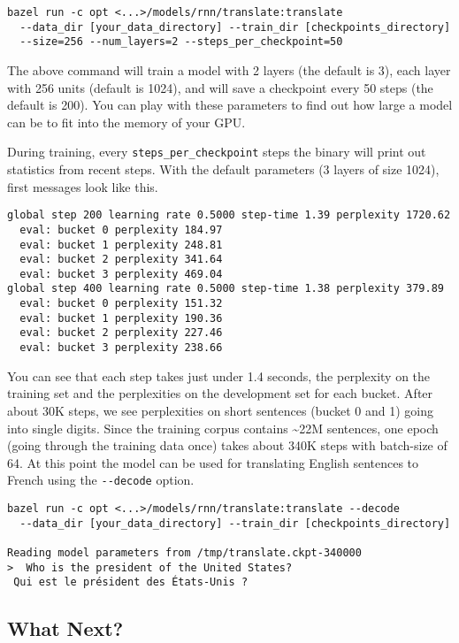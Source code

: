 \begin{verbatim}
bazel run -c opt <...>/models/rnn/translate:translate
  --data_dir [your_data_directory] --train_dir [checkpoints_directory]
  --size=256 --num_layers=2 --steps_per_checkpoint=50
\end{verbatim}

The above command will train a model with 2 layers (the default is 3),
each layer with 256 units (default is 1024), and will save a checkpoint
every 50 steps (the default is 200). You can play with these parameters
to find out how large a model can be to fit into the memory of your GPU.

During training, every \texttt{steps\_per\_checkpoint} steps the binary
will print out statistics from recent steps. With the default parameters
(3 layers of size 1024), first messages look like this.

\begin{verbatim}
global step 200 learning rate 0.5000 step-time 1.39 perplexity 1720.62
  eval: bucket 0 perplexity 184.97
  eval: bucket 1 perplexity 248.81
  eval: bucket 2 perplexity 341.64
  eval: bucket 3 perplexity 469.04
global step 400 learning rate 0.5000 step-time 1.38 perplexity 379.89
  eval: bucket 0 perplexity 151.32
  eval: bucket 1 perplexity 190.36
  eval: bucket 2 perplexity 227.46
  eval: bucket 3 perplexity 238.66
\end{verbatim}

You can see that each step takes just under 1.4 seconds, the perplexity
on the training set and the perplexities on the development set for each
bucket. After about 30K steps, we see perplexities on short sentences
(bucket 0 and 1) going into single digits. Since the training corpus
contains \textasciitilde{}22M sentences, one epoch (going through the
training data once) takes about 340K steps with batch-size of 64. At
this point the model can be used for translating English sentences to
French using the \texttt{-\/-decode} option.

\begin{verbatim}
bazel run -c opt <...>/models/rnn/translate:translate --decode
  --data_dir [your_data_directory] --train_dir [checkpoints_directory]

Reading model parameters from /tmp/translate.ckpt-340000
>  Who is the president of the United States?
 Qui est le président des États-Unis ?
\end{verbatim}

\subsection{What Next? }\label{what-next}

